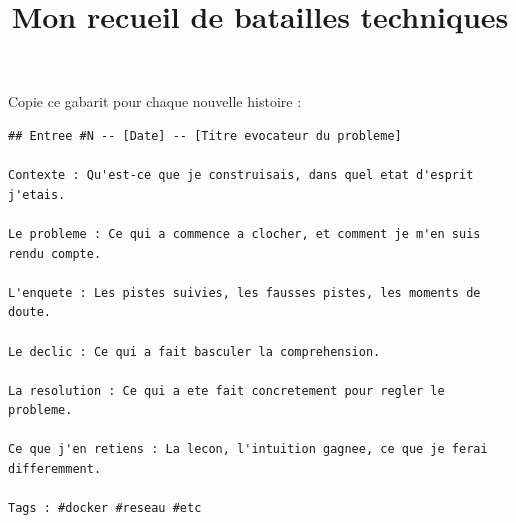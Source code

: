 \documentclass[11pt,a4paper]{article}
\title{\color{accentblue}\bfseries Mon recueil de batailles techniques}
\author{}
\date{}
\begin{document}
Copie ce gabarit pour chaque nouvelle histoire :

\begin{lstlisting}
## Entree #N -- [Date] -- [Titre evocateur du probleme]

Contexte : Qu'est-ce que je construisais, dans quel etat d'esprit j'etais.

Le probleme : Ce qui a commence a clocher, et comment je m'en suis rendu compte.

L'enquete : Les pistes suivies, les fausses pistes, les moments de doute.

Le declic : Ce qui a fait basculer la comprehension.

La resolution : Ce qui a ete fait concretement pour regler le probleme.

Ce que j'en retiens : La lecon, l'intuition gagnee, ce que je ferai differemment.

Tags : #docker #reseau #etc
\end{lstlisting}
\end{document}
